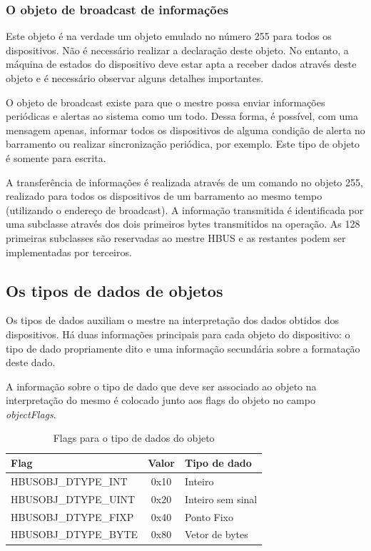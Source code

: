 \documentclass[11pt]{report}
\begin{document}
\subsubsection*{O objeto de broadcast de informações}

Este objeto é na verdade um objeto emulado no número 255 para todos os dispositivos. Não é necessário realizar a declaração deste objeto. No entanto, a máquina de estados do dispositivo deve estar apta a receber dados através deste objeto e é necessário observar alguns detalhes importantes.

O objeto de broadcast existe para que o mestre possa enviar informações periódicas e alertas ao sistema como um todo. Dessa forma, é possível, com uma mensagem apenas, informar todos os dispositivos de alguma condição de alerta no barramento ou realizar sincronização periódica, por exemplo. Este tipo de objeto é somente para escrita.

A transferência de informações é realizada através de um comando  no objeto 255, realizado para todos os dispositivos de um barramento ao mesmo tempo (utilizando o endereço de broadcast). A informação transmitida é identificada por uma subclasse através dos dois primeiros bytes transmitidos na operação. As 128 primeiras subclasses são reservadas ao mestre HBUS e as restantes podem ser implementadas por terceiros.


\subsection{Os tipos de dados de objetos}

Os tipos de dados auxiliam o mestre na interpretação dos dados obtidos dos dispositivos. Há duas informações principais para cada objeto do dispositivo: o tipo de dado propriamente dito e uma informação secundária sobre a formatação deste dado.

A informação sobre o tipo de dado que deve ser associado ao objeto na interpretação do mesmo é colocado junto aos flags do objeto no campo \textit{objectFlags}.

\begin{table}[H]
\centering
\label{table:datatypes}
\caption{Flags para o tipo de dados do objeto}
\begin{tabular}{l c l}
\hline
Flag					&	Valor	& Tipo de dado\\
\hline
HBUSOBJ\_DTYPE\_INT	&	0x10		& Inteiro\\
HBUSOBJ\_DTYPE\_UINT	&	0x20		& Inteiro sem sinal\\
HBUSOBJ\_DTYPE\_FIXP	&	0x40		& Ponto Fixo\\
HBUSOBJ\_DTYPE\_BYTE	&	0x80		& Vetor de bytes\\
\hline
\end{tabular}
\end{table}
\end{document}
